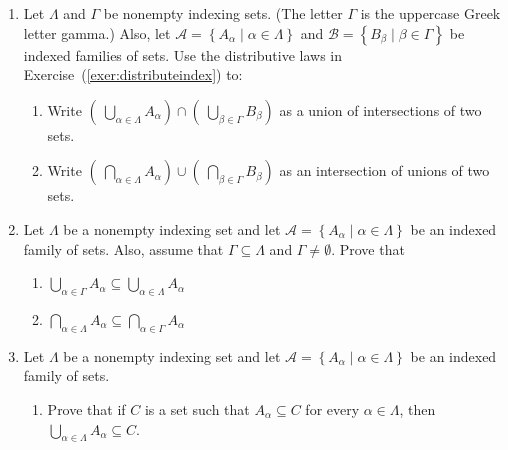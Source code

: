 \begin{enumerate}
\item Let $\Lambda$ and $\Gamma$ be nonempty indexing sets.  (\note The letter $\Gamma$ is the uppercase Greek letter gamma.) Also, let 
$\mathscr{A} = \left\{ A_\alpha \mid \alpha \in \Lambda \right\}$ and 
$\mathscr{B} = \left\{ B_\beta \mid \beta \in \Gamma \right\}$
be indexed families of sets.  Use the distributive laws in Exercise~(\ref{exer:distributeindex}) to: \label{exer:doubledistribute}
\begin{enumerate}
\item Write $\left(\: \bigcup\limits_{\alpha \in \Lambda}^{}A_\alpha\right) \cap \left(\: \bigcup\limits_{\beta \in \Gamma}^{}B_\beta \right)$ as a union of intersections of two sets.

\item Write $\left(\: \bigcap\limits_{\alpha \in \Lambda}^{}A_\alpha\right) \cup \left(\: \bigcap\limits_{\beta \in \Gamma}^{}B_\beta \right)$ as an intersection of unions of two sets.
\end{enumerate}




\item Let $\Lambda$ be a nonempty indexing set and let 
$\mathscr{A} = \left\{ A_\alpha \mid \alpha \in \Lambda \right\}$ be an indexed family of sets.  Also, assume that $\Gamma \subseteq \Lambda$ and $\Gamma \ne \emptyset$.    Prove that
\begin{multicols}{2}
\begin{enumerate}
\item $\bigcup\limits_{\alpha \in \Gamma}^{}A_\alpha \subseteq 
\bigcup\limits_{\alpha \in \Lambda}^{}A_\alpha$

\item $\bigcap\limits_{\alpha \in \Lambda}^{}A_\alpha \subseteq 
\bigcap\limits_{\alpha \in \Gamma}^{}A_\alpha$
\end{enumerate}
\end{multicols}



\item Let $\Lambda$ be a nonempty indexing set and let 
$\mathscr{A} = \left\{ A_\alpha \mid \alpha \in \Lambda \right\}$ be an indexed family of sets. 
\label{exer:indexsubsets}%

\begin{enumerate}
\yitem Prove that if $B$ is a set such that $B \subseteq A_\alpha$ for every 
$\alpha \in \Lambda$, then $B \subseteq \bigcap\limits_{\alpha \in \Lambda}^{}A_\alpha$.

\item Prove that if $C$ is a set such that $A_\alpha \subseteq C$ for every 
$\alpha \in \Lambda$, then $\bigcup\limits_{\alpha \in \Lambda}^{}A_\alpha \subseteq C$.
\end{enumerate}



\end{enumerate}
